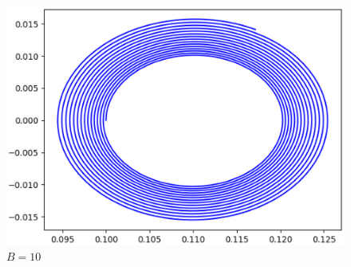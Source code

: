 \begin{figure}[htbp]
\includegraphics[scale=0.8]{./img/ka8_b10.eps}
\centering
\caption{$B=10$}
\label{8b10}
\end{figure}

%




